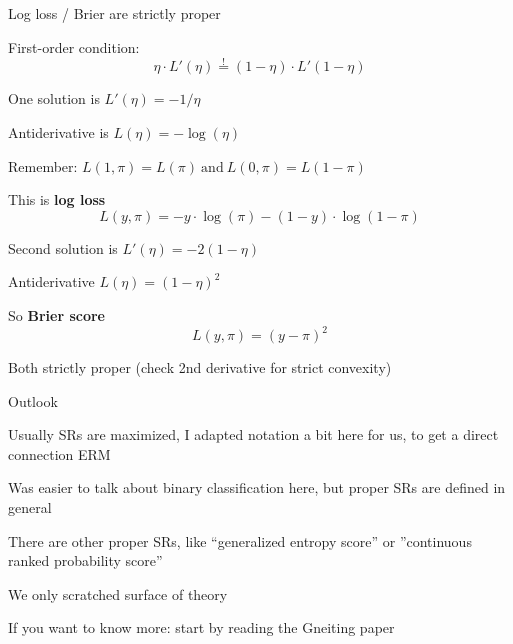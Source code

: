 \documentclass[11pt,compress,t,notes=noshow, xcolor=table]{beamer}
\providecommand{\Lpiy}{L\left(y, \pi\right)} %
\begin{document}
\begin{framei}[sep=M]{Log loss / Brier are strictly proper}

\item First-order condition: 
$$\eta \cdot L'(\eta) \overset{!}{=} (1-\eta) \cdot L'(1-\eta)$$
\item One solution is $L'(\eta)=-1/\eta$ %
\item Antiderivative is $L(\eta)=-\log(\eta)$ 
\item Remember: 
$L(1, \pi) = L(\pi) \ \text{and} \ L(0, \pi) = L(1-\pi)$
\item This is \textbf{log loss} 
$$\Lpiy=-y \cdot \log(\pi) - (1-y) \cdot \log(1-\pi)$$

\item Second solution is $L'(\eta)=-2(1-\eta)$%
\item Antiderivative $L(\eta)=(1-\eta)^2$%
\item So \textbf{Brier score} 
$$\Lpiy=(y - \pi)^2$$


\item Both strictly proper (check 2nd derivative for strict convexity)


\end{framei}

\begin{framei}[sep=L]{Outlook}

\item Usually SRs are maximized, I adapted notation a bit here
for us, to get a direct connection ERM

\item Was easier to talk about binary classification here, 
but proper SRs are defined in general

\item There are other proper SRs, like ``generalized entropy score'' or ''continuous ranked probability score'' 

\item We only scratched surface of theory

\item  If you want to know more: start by reading the Gneiting paper

\end{framei}



\endlecture
\end{document}
